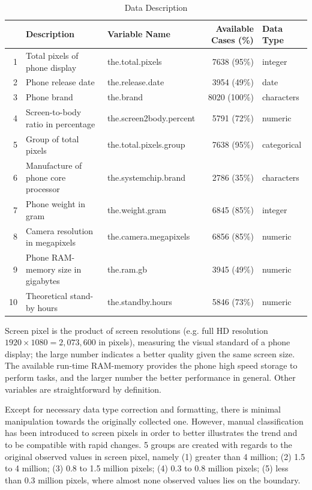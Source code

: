 \documentclass[utf8,english]{gradu3}
\begin{document}
\begin{table}[ht]
\label{tbl: vars}
\caption{Data Description}
\centering
\begin{tabular}{rllrl}
  \hline
 & Description & Variable Name & Available Cases (\%) & Data Type \\ 
  \hline
  1 & \multicolumn{1}{p{3.5cm}}{\raggedright Total pixels of phone display} & the.total.pixels & 7638 (95\%) & integer\\ 
  2 & \multicolumn{1}{p{3.5cm}}{\raggedright Phone release date} & the.release.date & 3954 (49\%) & date \\ 
  3 & \multicolumn{1}{p{3.5cm}}{\raggedright Phone brand} & the.brand & 8020 (100\%) & characters \\ 
  4 & \multicolumn{1}{p{3.5cm}}{\raggedright Screen-to-body ratio in percentage} & the.screen2body.percent & 5791 (72\%) & numeric\\ 
  5 & \multicolumn{1}{p{3.5cm}}{\raggedright Group of total pixels} & the.total.pixels.group & 7638 (95\%) & categorical \\ 
  6 & \multicolumn{1}{p{3.5cm}}{\raggedright Manufacture of phone core processor} & the.systemchip.brand & 2786 (35\%) & characters \\ 
  7 & \multicolumn{1}{p{3.5cm}}{\raggedright Phone weight in gram} & the.weight.gram & 6845 (85\%) & integer \\ 
  8 & \multicolumn{1}{p{3.5cm}}{\raggedright Camera resolution in megapixels} & the.camera.megapixels & 6856 (85\%) & numeric\\ 
  9 & \multicolumn{1}{p{3.5cm}}{\raggedright Phone RAM-memory size in gigabytes} & the.ram.gb & 3945 (49\%) & numeric\\ 
  10 & \multicolumn{1}{p{3.5cm}}{\raggedright Theoretical stand-by hours} & the.standby.hours & 5846 (73\%) & numeric \\ 
   \hline
\end{tabular}
\end{table}

Screen pixel is the product of screen resolutions (e.g. full HD resolution $1920\times 1080 = 2,073,600$ in pixels), measuring the visual standard of a phone display; the large number indicates a better quality given the same screen size. The available run-time RAM-memory provides the phone high speed storage to perform tasks, and the larger number the better performance in general. Other variables are straightforward by definition.

Except for necessary data type correction and formatting, there is minimal manipulation towards the originally collected one. However, manual classification has been introduced to screen pixels in order to better illustrates the trend and to be compatible with rapid changes. 5 groups are created with regards to the original observed values in screen pixel, namely (1) greater than 4 million; (2) 1.5 to 4 million; (3) 0.8 to 1.5 million pixels; (4) 0.3 to 0.8 million pixels; (5) less than 0.3 million pixels, where almost none observed values lies on the boundary.
\end{document}
